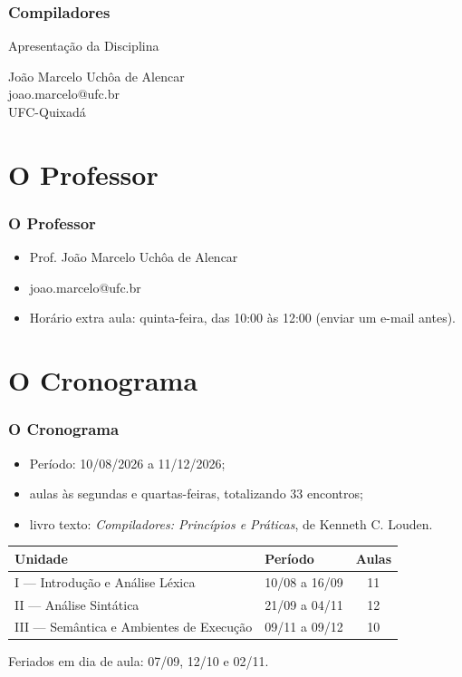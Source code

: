 \documentclass[table]{beamer}
\begin{document}
\begin{frame}
   \frametitle{Compiladores}
   \large
   \begin{center}
      Apresentação da Disciplina 
   \end{center}
   \scriptsize
   \begin{center}
      João Marcelo Uchôa de Alencar \\
      joao.marcelo@ufc.br \\
      UFC-Quixadá
   \end{center}
\end{frame}

\begin{frame}
   \tableofcontents
\end{frame}

\section{O Professor}
\begin{frame}
   \frametitle{O Professor}
   \begin{itemize}
      \item Prof. João Marcelo Uchôa de Alencar
      \item joao.marcelo@ufc.br
      \item Horário extra aula: quinta-feira, das 10:00 às 12:00 (enviar um e-mail antes).
   \end{itemize}
\end{frame}

\section{O Cronograma}
\begin{frame}
   \frametitle{O Cronograma}
   \begin{itemize}
      \item Período: 10/08/2026 a 11/12/2026;
      \item aulas às segundas e quartas-feiras, totalizando 33 encontros;
      \item livro texto: \textit{Compiladores: Princípios e Práticas}, de Kenneth C. Louden.
   \end{itemize}
   \vspace{0.3cm}
   \scriptsize
   \begin{center}
   \begin{tabular}{@{}llc@{}}
      \toprule
      \textbf{Unidade} & \textbf{Período} & \textbf{Aulas} \\
      \midrule
      I --- Introdução e Análise Léxica & 10/08 a 16/09 & 11 \\
      II --- Análise Sintática & 21/09 a 04/11 & 12 \\
      III --- Semântica e Ambientes de Execução & 09/11 a 09/12 & 10 \\
      \bottomrule
   \end{tabular}
   \end{center}
   \normalsize
   \vspace{0.2cm}
   Feriados em dia de aula: 07/09, 12/10 e 02/11.
\end{frame}
\end{document}
